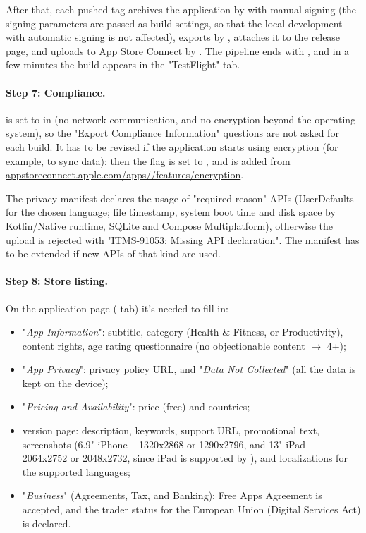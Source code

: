 \noindent After that, each pushed tag  archives the application by  with manual signing
(the signing parameters are passed as build settings, so that the local development with automatic signing is not
affected), exports  by , attaches it to the release page, and uploads to
App Store Connect by . The pipeline ends with , and in a few minutes
the build appears in the "TestFlight"-tab.

\paragraph{Step 7: Compliance.}  is set to  in 
(no network communication, and no encryption beyond the operating system), so the "Export Compliance Information"
questions are not asked for each build. It has to be revised if the application starts using encryption (for example, to
sync data): then the flag is set to , and  is added from
\href{https://appstoreconnect.apple.com/apps}{appstoreconnect.apple.com/apps//features/encryption}.

The privacy manifest  declares the usage of "required reason" APIs (UserDefaults
for the chosen language; file timestamp, system boot time and disk space by Kotlin/Native runtime, SQLite and Compose
Multiplatform), otherwise the upload is rejected with "ITMS-91053: Missing API declaration". The manifest has to be
extended if new APIs of that kind are used.

\paragraph{Step 8: Store listing.} On the application page (-tab) it's needed to fill in:

\begin{itemize}
  \item "\emph{App Information}": subtitle, category (Health \& Fitness, or Productivity), content rights, age rating
  questionnaire (no objectionable content $\rightarrow$ 4+);
  \item "\emph{App Privacy}": privacy policy URL, and "\emph{Data Not Collected}" (all the data is kept on the device);
  \item "\emph{Pricing and Availability}": price (free) and countries;
  \item version page: description, keywords, support URL, promotional text, screenshots (6.9" iPhone -- 1320x2868 or
  1290x2796, and 13" iPad -- 2064x2752 or 2048x2732, since iPad is supported by ), and
  localizations for the supported languages;
  \item "\emph{Business}" (Agreements, Tax, and Banking): Free Apps Agreement is accepted, and the trader status for the
  European Union (Digital Services Act) is declared.
\end{itemize}

